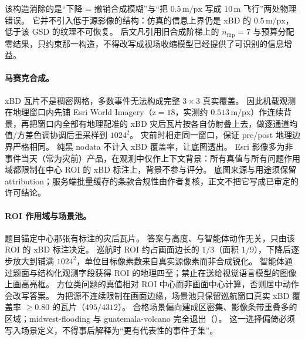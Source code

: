 该构造消除的是``下降 = 撤销合成模糊''与``把 $0.5\,\mathrm{m/px}$ 写成 $10\,\mathrm{m}$ 飞行''两处物理错误。
它并不引入低于源影像的结构：仿真的信息上界仍是 xBD 的 $0.5\,\mathrm{m/px}$，低于该 GSD 的纹理不可恢复。
后文凡引用旧合成阶梯上的 $n_{\mathrm{flip}}=7$ 与预算分配零结果，只约束那一构造，不得改写成视场收缩模型已经提供了可识别的信息增益。

\begin{table}[htbp]
\centering
\small
\setlength{\tabcolsep}{5pt}
\caption{视场收缩阶梯。高度由瓦片跨度与式~\eqref{eq:fov} 反推；ROI 边长比是中心标注瓦片在当前视场中的线性比例。}
\label{tab:fov}

\end{table}

\paragraph{马赛克合成。}
xBD 瓦片不是稠密网格，多数事件无法构成完整 $3\times3$ 真实覆盖。
因此机载观测在地理窗口内先铺 Esri World Imagery（z$=18$，实测约 $0.513\,\mathrm{m/px}$）作连续背景，再把窗口内全部有地理配准的 xBD 灾后瓦片按各自仿射叠上去，做逐通道均值/方差色调协调后重采样到 $1024^2$。
灾前时相走同一窗口，保证 pre/post 地理边界严格相同。
纯黑 nodata 不计入 xBD 覆盖率，让底图透出。
Esri 影像多为非事件当天（常为灾前）产品，在观测中仅作上下文背景：所有真值与所有问题作用域都限制在中心 ROI 的 xBD 标注上，背景不参与评分。
底图来源与用途须保留 attribution；服务端批量缓存的条款合规性由作者复核，正文不把它写成已审定的许可结论。

\paragraph{ROI 作用域与场景池。}
题目锚定中心那张有标注的灾后瓦片。
答案与高度、与智能体动作无关，只由该 ROI 的 xBD 标注决定。
巡航时 ROI 约占画面边长的 $1/3$（面积 $1/9$），下降后逐步放大到铺满 $1024^2$，单位目标像素数来自真实源像素而非合成锐化。
智能体通过题面与结构化观测字段获得 ROI 的地理四至；禁止在送给视觉语言模型的图像上画高亮框。
方位类问题的真值相对 ROI 中心而非画面中心计算，否则居中动作会改写答案。
为把源不连续限制在画面边缘，场景池只保留巡航窗口真实 xBD 覆盖率 $\ge 0.80$ 的瓦片（$495/4312$）。
合格场景偏向建成区密集、影像条带重叠多的区域；midwest-flooding 与 guatemala-volcano 完全退出（）。
这一选择偏倚必须写入场景定义，不得事后解释为``更有代表性的事件子集''。

\begin{table}[htbp]
\centering
\caption{巡航覆盖率 $\ge 0.80$ 的 ROI 场景池（$495$ 个有地理配准的灾后瓦片）。}
\label{tab:roipool}

\end{table}

